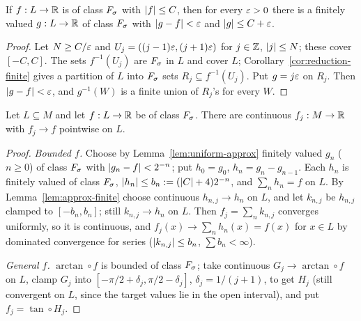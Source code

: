 \begin{lemma}\label{lem:uniform-approx}
If $f:L\to\mathbb{R}$ is of class $F_\sigma$ with $\lvert f\rvert\le C$, then for every $\varepsilon>0$ there is a finitely valued
$g:L\to\mathbb{R}$ of class $F_\sigma$ with $\lvert g-f\rvert<\varepsilon$ and $\lvert g\rvert\le C+\varepsilon$.
\end{lemma}
\begin{proof}
Let $N\ge C/\varepsilon$ and $U_j=((j-1)\varepsilon,(j+1)\varepsilon)$ for $j\in\mathbb{Z}$, $\lvert j\rvert\le N$; these cover $[-C,C]$.
The sets $f^{-1}(U_j)$ are $F_\sigma$ in $L$ and cover $L$; Corollary~\ref{cor:reduction-finite} gives a
partition of $L$ into $F_\sigma$ sets $R_j\subseteq f^{-1}(U_j)$. Put $g=j\varepsilon$ on $R_j$. Then
$\lvert g-f\rvert<\varepsilon$, and $g^{-1}(W)$ is a finite union of $R_j$'s for every $W$.
\end{proof}

\begin{lemma}\label{lem:approx-real}
Let $L\subseteq M$ and let $f:L\to\mathbb{R}$ be of class $F_\sigma$. There are continuous $f_j:M\to\mathbb{R}$ with
$f_j\to f$ pointwise on $L$.
\end{lemma}
\begin{proof}
\emph{Bounded $f$.} Choose by Lemma~\ref{lem:uniform-approx} finitely valued $g_n$ ($n\ge0$) of class
$F_\sigma$ with $\lvert g_n-f\rvert<2^{-n}$; put $h_0=g_0$, $h_n=g_n-g_{n-1}$. Each $h_n$ is finitely valued of class
$F_\sigma$, $\lvert h_n\rvert\le b_n:=(\lvert C\rvert+4)2^{-n}$, and $\sum_nh_n=f$ on $L$. By Lemma~\ref{lem:approx-finite}
choose continuous $h_{n,j}\to h_n$ on $L$, and let $k_{n,j}$ be $h_{n,j}$ clamped to $[-b_n,b_n]$; still
$k_{n,j}\to h_n$ on $L$. Then $f_j=\sum_nk_{n,j}$ converges uniformly, so it is continuous, and
$f_j(x)\to\sum_nh_n(x)=f(x)$ for $x\in L$ by dominated convergence for series ($\lvert k_{n,j}\rvert\le b_n$,
$\sum b_n<\infty$).

\emph{General $f$.} $\arctan\circ f$ is bounded of class $F_\sigma$; take continuous $G_j\to\arctan\circ f$
on $L$, clamp $G_j$ into $[-\pi/2+\delta_j,\pi/2-\delta_j]$, $\delta_j=1/(j+1)$, to get $H_j$ (still
convergent on $L$, since the target values lie in the open interval), and put $f_j=\tan\circ H_j$.
\end{proof}

